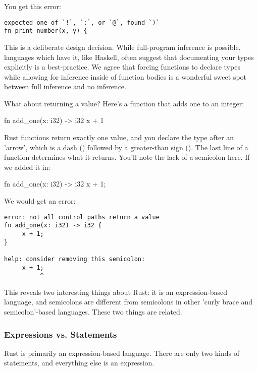 You get this error:

\begin{verbatim}
expected one of `!`, `:`, or `@`, found `)`
fn print_number(x, y) {
\end{verbatim}

This is a deliberate design decision. While full-program inference is possible, languages which have it, like Haskell, often 
suggest that documenting your types explicitly is a best-practice. We agree that forcing functions to declare types while 
allowing for inference inside of function bodies is a wonderful sweet spot between full inference and no inference.

\blank

What about returning a value? Here's a function that adds one to an integer:

\begin{rustc}
fn add_one(x: i32) -> i32 {
    x + 1
}
\end{rustc}

Rust functions return exactly one value, and you declare the type after an 'arrow', which is a dash (\code{-}) followed by a 
greater-than sign (\code{>}). The last line of a function determines what it returns. You'll note the lack of a semicolon here. 
If we added it in:

\begin{rustc}
fn add_one(x: i32) -> i32 {
    x + 1;
}
\end{rustc}

We would get an error:

\begin{verbatim}
error: not all control paths return a value
fn add_one(x: i32) -> i32 {
     x + 1;
}

help: consider removing this semicolon:
     x + 1;
          ^
\end{verbatim}

This reveals two interesting things about Rust: it is an expression-based language, and semicolons are different from semicolons 
in other 'curly brace and semicolon'-based languages. These two things are related.

\subsubsection*{Expressions vs. Statements}

Rust is primarily an expression-based language. There are only two kinds of statements, and everything else is an expression.

